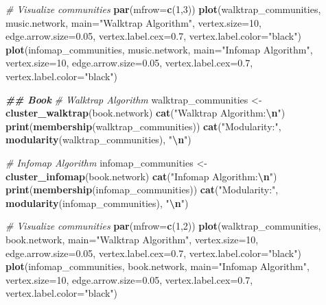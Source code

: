 \documentclass[
]{article}
\newenvironment{Shaded}{\begin{snugshade}}{\end{snugshade}}
\newcommand{\AttributeTok}[1]{\textcolor[rgb]{0.13,0.29,0.53}{#1}}
\newcommand{\CommentTok}[1]{\textcolor[rgb]{0.56,0.35,0.01}{\textit{#1}}}
\newcommand{\DecValTok}[1]{\textcolor[rgb]{0.00,0.00,0.81}{#1}}
\newcommand{\DocumentationTok}[1]{\textcolor[rgb]{0.56,0.35,0.01}{\textbf{\textit{#1}}}}
\newcommand{\FloatTok}[1]{\textcolor[rgb]{0.00,0.00,0.81}{#1}}
\newcommand{\FunctionTok}[1]{\textcolor[rgb]{0.13,0.29,0.53}{\textbf{#1}}}
\newcommand{\NormalTok}[1]{#1}
\newcommand{\OtherTok}[1]{\textcolor[rgb]{0.56,0.35,0.01}{#1}}
\newcommand{\SpecialCharTok}[1]{\textcolor[rgb]{0.81,0.36,0.00}{\textbf{#1}}}
\newcommand{\StringTok}[1]{\textcolor[rgb]{0.31,0.60,0.02}{#1}}
\begin{document}
\begin{Shaded}
\begin{Highlighting}[]
\CommentTok{\# Visualize communities }
\FunctionTok{par}\NormalTok{(}\AttributeTok{mfrow=}\FunctionTok{c}\NormalTok{(}\DecValTok{1}\NormalTok{,}\DecValTok{3}\NormalTok{))}
\FunctionTok{plot}\NormalTok{(walktrap\_communities, music.network, }\AttributeTok{main=}\StringTok{"Walktrap Algorithm"}\NormalTok{, }\AttributeTok{vertex.size=}\DecValTok{10}\NormalTok{, }\AttributeTok{edge.arrow.size=}\FloatTok{0.05}\NormalTok{, }\AttributeTok{vertex.label.cex=}\FloatTok{0.7}\NormalTok{, }\AttributeTok{vertex.label.color=}\StringTok{"black"}\NormalTok{)}
\FunctionTok{plot}\NormalTok{(infomap\_communities, music.network, }\AttributeTok{main=}\StringTok{"Infomap Algorithm"}\NormalTok{, }\AttributeTok{vertex.size=}\DecValTok{10}\NormalTok{, }\AttributeTok{edge.arrow.size=}\FloatTok{0.05}\NormalTok{, }\AttributeTok{vertex.label.cex=}\FloatTok{0.7}\NormalTok{, }\AttributeTok{vertex.label.color=}\StringTok{"black"}\NormalTok{)}

\DocumentationTok{\#\# Book}
\CommentTok{\# Walktrap Algorithm}
\NormalTok{walktrap\_communities }\OtherTok{\textless{}{-}} \FunctionTok{cluster\_walktrap}\NormalTok{(book.network)}
\FunctionTok{cat}\NormalTok{(}\StringTok{"Walktrap Algorithm:}\SpecialCharTok{\textbackslash{}n}\StringTok{"}\NormalTok{)}
\FunctionTok{print}\NormalTok{(}\FunctionTok{membership}\NormalTok{(walktrap\_communities))}
\FunctionTok{cat}\NormalTok{(}\StringTok{"Modularity:"}\NormalTok{, }\FunctionTok{modularity}\NormalTok{(walktrap\_communities), }\StringTok{"}\SpecialCharTok{\textbackslash{}n}\StringTok{"}\NormalTok{)}

\CommentTok{\# Infomap Algorithm}
\NormalTok{infomap\_communities }\OtherTok{\textless{}{-}} \FunctionTok{cluster\_infomap}\NormalTok{(book.network)}
\FunctionTok{cat}\NormalTok{(}\StringTok{"Infomap Algorithm:}\SpecialCharTok{\textbackslash{}n}\StringTok{"}\NormalTok{)}
\FunctionTok{print}\NormalTok{(}\FunctionTok{membership}\NormalTok{(infomap\_communities))}
\FunctionTok{cat}\NormalTok{(}\StringTok{"Modularity:"}\NormalTok{, }\FunctionTok{modularity}\NormalTok{(infomap\_communities), }\StringTok{"}\SpecialCharTok{\textbackslash{}n}\StringTok{"}\NormalTok{)}

\CommentTok{\# Visualize communities}
\FunctionTok{par}\NormalTok{(}\AttributeTok{mfrow=}\FunctionTok{c}\NormalTok{(}\DecValTok{1}\NormalTok{,}\DecValTok{2}\NormalTok{))}
\FunctionTok{plot}\NormalTok{(walktrap\_communities, book.network, }\AttributeTok{main=}\StringTok{"Walktrap Algorithm"}\NormalTok{, }\AttributeTok{vertex.size=}\DecValTok{10}\NormalTok{, }\AttributeTok{edge.arrow.size=}\FloatTok{0.05}\NormalTok{, }\AttributeTok{vertex.label.cex=}\FloatTok{0.7}\NormalTok{, }\AttributeTok{vertex.label.color=}\StringTok{"black"}\NormalTok{)}
\FunctionTok{plot}\NormalTok{(infomap\_communities, book.network, }\AttributeTok{main=}\StringTok{"Infomap Algorithm"}\NormalTok{, }\AttributeTok{vertex.size=}\DecValTok{10}\NormalTok{, }\AttributeTok{edge.arrow.size=}\FloatTok{0.05}\NormalTok{, }\AttributeTok{vertex.label.cex=}\FloatTok{0.7}\NormalTok{, }\AttributeTok{vertex.label.color=}\StringTok{"black"}\NormalTok{)}


\end{Highlighting}
\end{Shaded}
\end{document}
